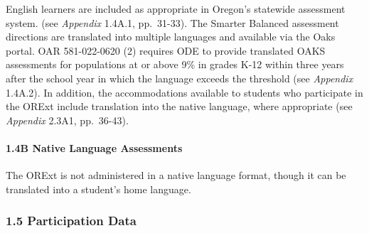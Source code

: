 \documentclass[]{article}
\let\oldparagraph\paragraph
\renewcommand{\paragraph}[1]{\oldparagraph{#1}\mbox{}}
\begin{document}
English learners are included as appropriate in Oregon's statewide
assessment system. (see \emph{Appendix} 1.4A.1, pp.~31-33). The Smarter
Balanced assessment directions are translated into multiple languages
and available via the Oaks portal. OAR 581-022-0620 (2) requires ODE to
provide translated OAKS assessments for populations at or above 9\% in
grades K-12 within three years after the school year in which the
language exceeds the threshold (see \emph{Appendix} 1.4A.2). In
addition, the accommodations available to students who participate in
the ORExt include translation into the native language, where
appropriate (see \emph{Appendix} 2.3A1, pp.~36-43).

\paragraph{1.4B Native Language
Assessments}\label{b-native-language-assessments}

The ORExt is not administered in a native language format, though it can
be translated into a student's home language.

\subsubsection{1.5 Participation Data}\label{participation-data}
\end{document}
